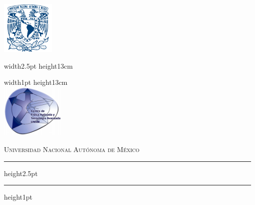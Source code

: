 \newcommand{\colorvrule}[3]{
\begingroup\color{#1}\vrule width#2 height#3
\endgroup}
\newcommand{\colorhrule}[2]{
\begingroup\color{#1}\hrule height#2
\endgroup}

\begin{titlepage}
\begin{center}
\thispagestyle{empty}
\hskip -2cm
\begin{minipage}[c][10cm][s]{3cm}
  \begin{center}
    \includegraphics[height=2.6cm]{./titlepage/unam_azul_5x5cm}\\[10pt]
    \hskip2pt
    \colorvrule{Azul}{2.5pt}{13cm}
    \hskip -0.4mm
    \colorvrule{Oro}{1pt}{13cm}\\[10pt]
    \includegraphics[height=2.6cm]{./titlepage/cfata_logo.png}
  \end{center}
\end{minipage}\quad
\begin{minipage}[c][9.5cm][s]{11cm}
  \begin{center}
    {\large \scshape Universidad Nacional Aut\'onoma de M\'exico} %
    \vspace{.3cm}
    \colorhrule{Azul}{2.5pt} 

    \vspace{.1cm}
    \colorhrule{Oro}{1pt}


\end{center}
\end{minipage}
\end{center}
\end{titlepage}

